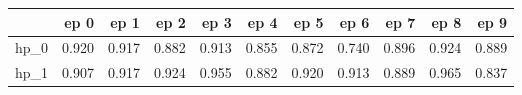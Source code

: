 \begin{tabular}{lrrrrrrrrrr}
\toprule
{} &   ep 0 &   ep 1 &   ep 2 &   ep 3 &   ep 4 &   ep 5 &   ep 6 &   ep 7 &   ep 8 &   ep 9 \\
\midrule
hp\_0 &  0.920 &  0.917 &  0.882 &  0.913 &  0.855 &  0.872 &  0.740 &  0.896 &  0.924 &  0.889 \\
hp\_1 &  0.907 &  0.917 &  0.924 &  0.955 &  0.882 &  0.920 &  0.913 &  0.889 &  0.965 &  0.837 \\
\bottomrule
\end{tabular}
